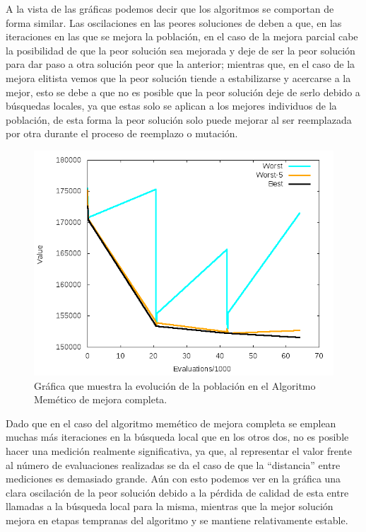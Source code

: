 \documentclass[11pt,a4paper]{article}
\begin{document}
	\noindent A la vista de las gráficas podemos decir que los algoritmos se comportan de forma similar. Las oscilaciones en las peores soluciones de deben a que, en las iteraciones en las que se mejora la población, en el caso de la mejora parcial cabe la posibilidad de que la peor solución sea mejorada y deje de ser la peor solución para dar paso a otra solución peor que la anterior; mientras que, en el caso de la mejora elitista vemos que la peor solución tiende a estabilizarse y acercarse a la mejor, esto se debe a que no es posible que la peor solución deje de serlo debido a búsquedas locales, ya que estas solo se aplican a los mejores individuos de la población, de esta forma la peor solución solo puede mejorar al ser reemplazada por otra durante el proceso de reemplazo o mutación.
	
	\begin{figure}[!h]
		\centering
		\includegraphics[scale=0.42]{Plots/AMFull.png} 
		\caption{Gráfica que muestra la evolución de la población en el Algoritmo Memético de mejora completa.} \label{fig:figura5}
	\end{figure}
	
	\noindent Dado que en el caso del algoritmo memético de mejora completa se emplean muchas más iteraciones en la búsqueda local  que en los otros dos, no es posible hacer una medición realmente significativa, ya que, al representar el valor frente al número de evaluaciones realizadas se da el caso de que la ``distancia'' entre mediciones es demasiado grande. Aún con esto podemos ver en la gráfica una clara oscilación de la peor solución debido a la pérdida de calidad de esta entre llamadas a la búsqueda local para la misma, mientras que la mejor solución mejora en etapas tempranas del algoritmo y se mantiene relativamente estable.
	
\end{document}

